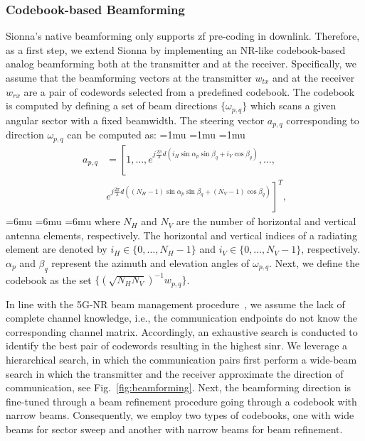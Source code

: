 \subsubsection{Codebook-based Beamforming}
Sionna's native beamforming only supports \gls{zf} pre-coding in downlink. Therefore, as a first step, we extend Sionna by implementing an NR-like codebook-based analog beamforming both at the transmitter and at the receiver.
Specifically, we assume that the beamforming vectors at the transmitter $w_{tx}$ and at the receiver $w_{rx}$ are a pair of codewords selected from a predefined codebook. The codebook is computed by defining a set of beam directions $\{ \omega_{p,q} \}$ which scans a given angular sector with a fixed beamwidth. The steering vector $a_{p,q}$ corresponding to direction $\omega_{p, q}$ can be computed as:
\medmuskip=1mu
\thinmuskip=1mu
\thickmuskip=1mu
\begin{equation}
    \begin{aligned}
            a_{p,q} &= \left[ 1,\ldots, e^{j\frac{2\pi}{\lambda}d\left(i_{ H}\sin\alpha_p\sin\beta_q+i_{V}\cos\beta_q\right)}, \ldots,  \right. \\ 
            & \left. e^{j\frac{2\pi}{\lambda}d\left((N_{H}-1)\sin\alpha_p\sin\beta_q + (N_{ V}-1)\cos\beta_q\right)} \right] ^T,
    \end{aligned}
\end{equation}
\medmuskip=6mu
\thinmuskip=6mu
\thickmuskip=6mu
where $N_{H}$ and $N_{V}$ are the number of horizontal and vertical antenna elements, respectively. The horizontal and vertical indices of a radiating element are denoted by $i_{H}\in \{0, \ldots, N_{H} - 1 \}$ and $i_{V}\in \{0, \ldots, N_{V} - 1\}$, respectively. $\alpha_p$ and $\beta_q$ represent the azimuth and elevation angles of $\omega_{p, q}$. Next, we define the codebook as the set $\{ \left( \sqrt{N_{H} N_{V}} \right)^{-1} w_{p, q} \}$. 

In line with the 5G-NR beam management procedure~\cite{giordani2018tutorial}, we assume the lack of complete channel knowledge, i.e., the communication endpoints do not know the corresponding channel matrix. Accordingly, an exhaustive search is conducted to identify the best pair of codewords resulting in the highest \gls{sinr}. We leverage a hierarchical search, in which the communication pairs first perform a wide-beam search
in which the transmitter and the receiver approximate the direction of communication, see Fig.~\ref{fig:beamforming}. Next, the beamforming direction is fine-tuned through a beam refinement procedure going through a codebook with narrow beams. Consequently, we employ two types of codebooks, one with wide beams for sector sweep and another with narrow beams for beam refinement.   

